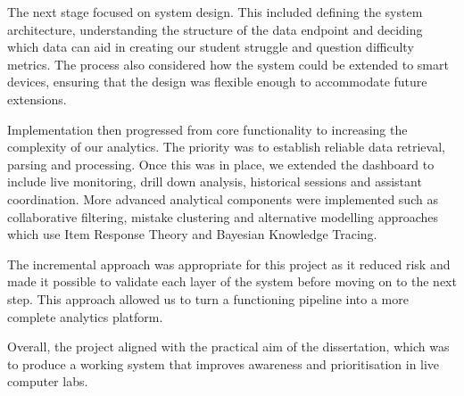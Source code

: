 The next stage focused on system design. This included defining the system architecture, understanding the structure of the data endpoint and deciding which data can aid in creating our student struggle and question difficulty metrics.
The process also considered how the system could be extended to smart devices, ensuring that the design was flexible enough to accommodate future extensions.

Implementation then progressed from core functionality to increasing the complexity of our analytics.
The priority was to establish reliable data retrieval, parsing and processing. 
Once this was in place, we extended the dashboard to include live monitoring, drill down analysis, historical sessions and assistant coordination.
More advanced analytical components were implemented such as collaborative filtering, mistake clustering and alternative modelling approaches which use Item Response Theory and Bayesian Knowledge Tracing.

The incremental approach was appropriate for this project as it reduced risk and made it possible to validate each layer of the system before moving on to the next step.
This approach allowed us to turn a functioning pipeline into a more complete analytics platform.

Overall, the project aligned with the practical aim of the dissertation, which was to produce a working system that improves awareness and prioritisation in live computer labs.

